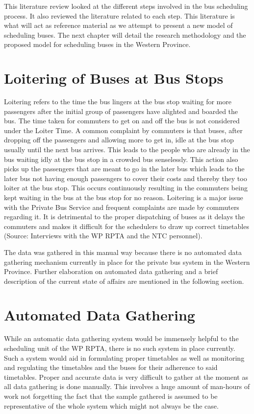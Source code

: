 This literature review looked at the different steps involved in the bus scheduling process. It also reviewed the literature related to each step. This literature is what will act as reference material as we attempt to present a new model of scheduling buses. The next chapter will detail the research methodology and the proposed model for scheduling buses in the Western Province.

\section{Loitering of Buses at Bus Stops} Loitering refers to the time the bus lingers at the bus stop waiting for more passengers after the initial group of passengers have alighted and boarded the bus. The time taken for commuters to get on and off the bus is not considered under the Loiter Time. A common complaint by commuters is that buses, after dropping off the passengers and allowing more to get in, idle at the bus stop usually until the next bus arrives. This leads to the people who are already in the bus waiting idly at the bus stop in a crowded bus senselessly. This action also picks up the passengers that are meant to go in the later bus which leads to the later bus not having enough passengers to cover their costs and thereby they too loiter at the bus stop. This occurs continuously resulting in the commuters being kept waiting in the bus at the bus stop for no reason. Loitering is a major issue with the Private Bus Service and frequent complaints are made by commuters regarding it. It is detrimental to the proper dispatching of buses as it delays the commuters and makes it difficult for the schedulers to draw up correct timetables (Source: Interviews with the WP RPTA and the NTC personnel).

The data was gathered in this manual way because there is no automated data gathering mechanism currently in place for the private bus system in the Western Province. Further elaboration on automated data gathering and a brief description of the current state of affairs are mentioned in the following section.


\section{Automated Data Gathering}

\paragraph{ } While an automatic data gathering system would be immensely helpful to the scheduling unit of the WP RPTA, there is no such system in place currently. Such a system would aid in formulating proper timetables as well as monitoring and regulating the timetables and the buses for their adherence to said timetables. Proper and accurate data is very difficult to gather at the moment as all data gathering is done manually. This involves a huge amount of man-hours of work not forgetting the fact that the sample gathered is assumed to be representative of the whole system which might not always be the case.


